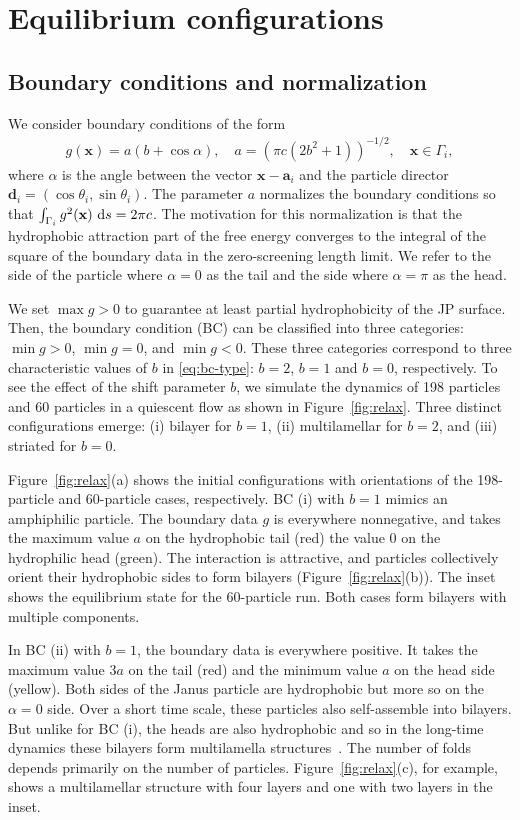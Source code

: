 \documentclass[prb,preprint,showpacs,preprintnumbers,amsmath,amssymb,longbibliography]{revtex4-1}
\renewcommand{\aa}{\mathbf{a}}
\newcommand{\dd}{\mathbf{d}}
\newcommand{\xx}{\mathbf{x}}
\begin{document}
\section{Equilibrium configurations}
\subsection{Boundary conditions and normalization}
We consider boundary conditions of the form
\begin{align}
  \label{eq:bc-type}
g(\xx) = a(b + \cos \alpha),\quad a = (\pi c(2b^2 + 1))^{-1/2},\quad \xx \in \Gamma_i,
\end{align}
where $\alpha$ is the angle between the vector $\xx - \aa_i$ and 
the particle director $\dd_i = (\cos \theta_i, \sin \theta_i)$.
The parameter $a$ normalizes the boundary conditions 
so that $\int_{\Gamma_i} g^2(\xx) \, \dif s =  2\pi c$.
The motivation for this normalization is that the hydrophobic attraction
part of the free energy converges to the integral of the square of the boundary
data in the zero-screening length limit.  
We refer to the side of the particle where $\alpha = 0$
as the tail and the side where $\alpha = \pi$ as the head. 


We set $\max g>0$ to guarantee at least partial hydrophobicity of the JP
surface.  Then, the boundary condition (BC) can be classified into three
categories: $\min g >0$, $\min g =0$, and $\min g <0$.  These three
categories correspond to three characteristic values of $b$ in
\eqref{eq:bc-type}: $b=2$, $b=1$ and $b=0$, respectively. 
%
To see the effect of the shift parameter $b$, we simulate the dynamics
of 198 particles and 60 particles in a quiescent flow as shown in
Figure~\ref{fig:relax}. Three distinct configurations emerge: (i)
bilayer for $b = 1$, (ii) multilamellar for $b = 2$, and (iii) striated
for $b = 0$.

Figure~\ref{fig:relax}(a) shows the initial configurations with
orientations of the 198-particle and 60-particle cases, respectively.
BC (i) with $b = 1$ mimics an amphiphilic particle. The boundary data
$g$ is everywhere nonnegative, and takes the maximum value $a$ on the
hydrophobic tail (red) the value $0$ on the hydrophilic head (green).
The interaction is attractive, and particles collectively orient their
hydrophobic sides to form bilayers (Figure~\ref{fig:relax}(b)). The
inset shows the equilibrium state for the 60-particle run. Both cases
form bilayers with multiple components.

In BC (ii) with $b = 1$, the boundary data is everywhere positive. It
takes the maximum value $3a$ on the tail (red) and the minimum value $a$
on the head side (yellow). Both sides of the Janus particle are
hydrophobic but more so on the $\alpha = 0$ side. Over a short time
scale, these particles also self-assemble into bilayers. But unlike for
BC (i), the heads are also hydrophobic and so in the long-time dynamics
these bilayers form multilamella structures~\cite{C9NR05885K}. The
number of folds depends primarily on the number of particles.
Figure~\ref{fig:relax}(c), for example, shows a multilamellar structure
with four layers and one with two layers in the inset.
\end{document}
